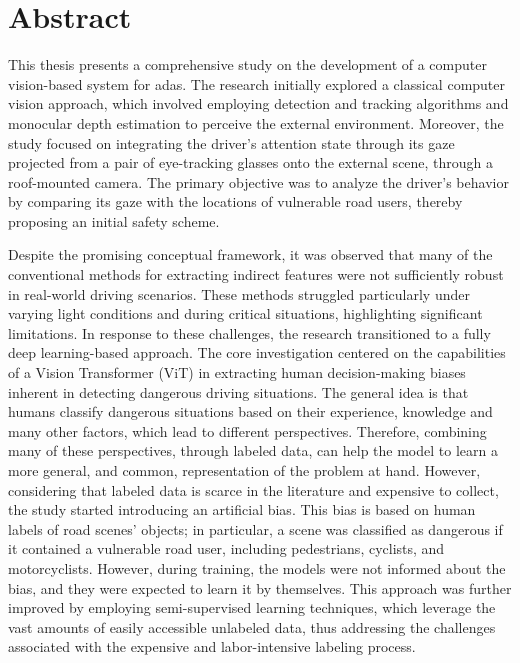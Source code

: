 \thispagestyle{empty}
\section*{Abstract}
\vspace{0.5cm}
This thesis presents a comprehensive study on the development of a computer 
vision-based system for \acf{adas}. The research 
initially explored a classical computer vision approach, which involved 
employing detection and tracking algorithms and monocular depth estimation
to perceive the external environment. Moreover, the study focused on 
integrating the driver’s attention state through its gaze projected from a pair 
of eye-tracking glasses onto the external scene, through a roof-mounted camera.
The primary objective was to analyze the driver's behavior by comparing 
its gaze with the locations of vulnerable road users, thereby proposing 
an initial safety scheme.

Despite the promising conceptual framework, it was observed that many of the 
conventional methods for extracting indirect features were not sufficiently 
robust in real-world driving scenarios. These methods struggled particularly 
under varying light conditions and during critical situations, highlighting 
significant limitations. In response to these challenges, the research 
transitioned to a fully deep learning-based approach. The core investigation centered 
on the capabilities of a Vision Transformer (ViT) in extracting human decision-making 
biases inherent in detecting dangerous driving situations.
The general idea is that humans classify dangerous situations based on their 
experience, knowledge and many other factors, which lead to different 
perspectives. Therefore, combining many of these perspectives, through labeled 
data, can help the model to learn a more general, and common, representation of 
the problem at hand. However, considering that labeled data is scarce in the 
literature and expensive to collect, the study started introducing an artificial 
bias. This bias is based on human labels of road scenes' objects; in particular, 
a scene was classified as dangerous if it contained a vulnerable road user, 
including pedestrians, cyclists, and motorcyclists. 
However, during training, the models were not informed about the bias, 
and they were expected to learn it by themselves.
This approach was further improved by 
employing semi-supervised learning techniques, which leverage the 
vast amounts of easily accessible unlabeled data, thus 
addressing the challenges associated with the expensive and labor-intensive 
labeling process.

